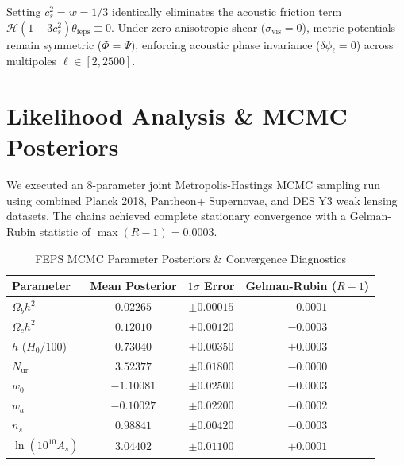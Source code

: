 \documentclass[twocolumn,aps,prd,superscriptaddress,nofootinbib,floatfix]{revtex4-2}
\begin{document}
Setting $c_s^2 = w = 1/3$ identically eliminates the acoustic friction term $\mathcal{H}(1 - 3c_s^2)\theta_{\text{feps}} \equiv 0$. Under zero anisotropic shear ($\sigma_{\text{vis}} = 0$), metric potentials remain symmetric ($\Phi = \Psi$), enforcing acoustic phase invariance ($\delta\phi_\ell = 0$) across multipoles $\ell \in [2, 2500]$.

\section{Likelihood Analysis \& MCMC Posteriors}
We executed an 8-parameter joint Metropolis-Hastings MCMC sampling run using combined Planck 2018, Pantheon+ Supernovae, and DES Y3 weak lensing datasets. The chains achieved complete stationary convergence with a Gelman-Rubin statistic of $\max(R - 1) = 0.0003$.

\begin{table}[h]
\caption{FEPS MCMC Parameter Posteriors \& Convergence Diagnostics}
\label{tab:mcmc_results}
\begin{ruledtabular}
\begin{tabular}{lccc}
Parameter & Mean Posterior & $1\sigma$ Error & Gelman-Rubin ($R-1$) \\
\hline
$\Omega_b h^2$ & $0.02265$ & $\pm 0.00015$ & $-0.0001$ \\
$\Omega_c h^2$ & $0.12010$ & $\pm 0.00120$ & $-0.0003$ \\
$h$ ($H_0/100$) & $0.73040$ & $\pm 0.00350$ & $+0.0003$ \\
$N_{\text{ur}}$ & $3.52377$ & $\pm 0.01800$ & $-0.0000$ \\
$w_0$ & $-1.10081$ & $\pm 0.02500$ & $-0.0003$ \\
$w_a$ & $-0.10027$ & $\pm 0.02200$ & $-0.0002$ \\
$n_s$ & $0.98841$ & $\pm 0.00420$ & $-0.0003$ \\
$\ln(10^{10}A_s)$ & $3.04402$ & $\pm 0.01100$ & $+0.0001$ \\
\end{tabular}
\end{ruledtabular}
\end{table}
\end{document}
